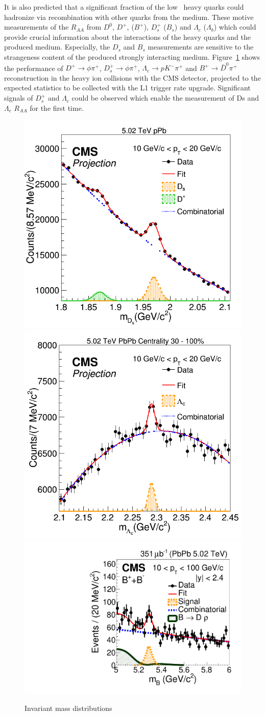 It is also predicted that a significant fraction of the low \pt\ heavy quarks could hadronize via recombination with other quarks from the medium. These motive measurements of the $R_{AA}$ from $D^0$, $D^+$, ($B^+$), $D_s^+$ ($B_s$) and $\Lambda_c$ ($\Lambda_b$) which could provide crucial information about the interactions of the heavy quarks and the produced medium. Especially, the $D_s$ and $B_s$ measurements are sensitive to the strangeness content of the produced strongly interacting medium. Figure~\ref{fig:HFMesonMass} shows the performance of $D^+\rightarrow \phi\pi^+$, $D_s^+\rightarrow \phi \pi^+$, $\Lambda_c\rightarrow p K^-\pi^+$ and $B^+\rightarrow \bar{D}^0 \pi^+$ reconstruction in the heavy ion collisions with the CMS detector, projected to the expected statistics to be collected with the L1 trigger rate upgrade. Significant signals of $D_s^+$ and $\Lambda_c$ could be observed which enable the measurement of Ds and $\Lambda_c$ $R_{AA}$ for the first time. 


\begin{figure}[!ht]
\begin{center}
\includegraphics[width=.32\textwidth]{InvMassFigures/Ds.png}
\includegraphics[width=.32\textwidth]{InvMassFigures/LambdaC.png}
\includegraphics[width=.335\textwidth]{InvMassFigures/BtoDpi_data_PbPb_10_100.pdf}
\caption{Invariant mass distributions}
\label{fig:HFMesonMass}
\end{center}
\end{figure}


